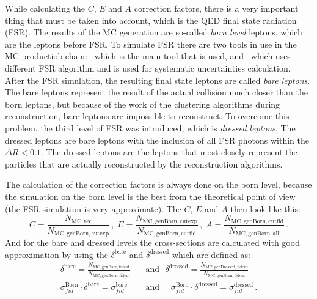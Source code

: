 While calculating the $C$, $E$ and $A$ correction factors, there is a very important thing that must be taken into account, which is the QED final state radiation (FSR). The results of the MC generation are so-called {\itshape born level} leptons, which are the leptons before FSR. To simulate FSR there are two tools in use in the MC productiob chain: \Photos\, which is the main tool that is used, and \Sherpa\ which uses different FSR algorithm and is used for systematic uncertainties calculation. After the FSR simulation, the resulting final state leptons are called {\itshape bare leptons}. The bare leptons represent the result of the actual collision much closer than the born leptons, but because of the work of the clustering algorithms during reconstruction, bare leptons are impossible to reconstruct. To overcome this problem, the third level of FSR was introduced, which is {\itshape dressed leptons}. The dressed leptons are bare leptons with the inclusion of all FSR photons within the $\Delta R < 0.1$. The dressed leptons are the leptons that most closely represent the particles that are actually reconstructed by the reconstruction algorithms.

The calculation of the correction factors is always done on the born level, because the simulation on the born level is the best from the theoretical point of view (the FSR simulation is very approximate). The $C$, $E$ and $A$ then look like this:
\begin{equation}
C = \frac{N_\mathrm{MC, rec}}{N_\mathrm{MC, genBorn, cutexp}}\,, \;
E = \frac{N_\mathrm{MC, genBorn, cutexp}}{N_\mathrm{MC, genBorn, cutfid}}\,, \;
A = \frac{N_\mathrm{MC, genBorn, cutfid}}{N_\mathrm{MC, genBorn, all}}\,.
\end{equation}
And for the bare and dressed levels the cross-sections are calculated with good approximation by using the $\delta^\mathrm{bare}$ and $\delta^\mathrm{dressed}$ which are defined as:
\begin{equation}
\begin{split}
  \delta^\mathrm{bare} = \frac{N_\mathrm{MC, genBare, fidcut}}{N_\mathrm{MC, genBorn, fidcut}}\:\:\:&\mbox{and}\:\:\:
  \delta^\mathrm{dressed} = \frac{N_\mathrm{MC, genDressed, fidcut}}{N_\mathrm{MC, genBorn, fidcut}}\\
  \sigma_{fid}^\mathrm{Born} \cdot \delta^\mathrm{bare} =
  \sigma_{fid}^\mathrm{bare} \:\:\:\:\:\:&\mbox{and}\:\:\:\:\:\:
  \sigma_{fid}^\mathrm{Born} \cdot \delta^\mathrm{dressed} =
  \sigma_{fid}^\mathrm{dressed} \,.
\end{split}
\end{equation}

